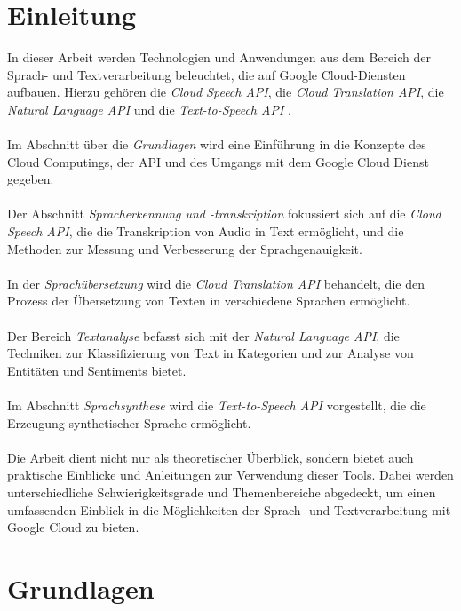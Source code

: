 \documentclass[12pt,a4paper]{article}
\begin{document}
\section*{Einleitung}
In dieser Arbeit werden Technologien und Anwendungen aus dem Bereich der Sprach- und Textverarbeitung beleuchtet, die auf Google Cloud-Diensten aufbauen. Hierzu gehören die \textit{Cloud Speech API}, die \textit{Cloud Translation API}, die \textit{Natural Language API} und die \textit{Text-to-Speech API} \cite{googlecloudskills2023}.
\\ \\
Im Abschnitt über die \textit{Grundlagen} wird eine Einführung in die Konzepte des Cloud Computings, der API und des Umgangs mit dem Google Cloud Dienst gegeben. 
\\ \\
Der Abschnitt \textit{Spracherkennung und -transkription} fokussiert sich auf die \textit{Cloud Speech API}, die die Transkription von Audio in Text ermöglicht, und die Methoden zur Messung und Verbesserung der Sprachgenauigkeit.
\\ \\
In der \textit{Sprachübersetzung} wird die \textit{Cloud Translation API} behandelt, die den Prozess der Übersetzung von Texten in verschiedene Sprachen ermöglicht.
\\ \\
Der Bereich \textit{Textanalyse} befasst sich mit der \textit{Natural Language API}, die Techniken zur Klassifizierung von Text in Kategorien und zur Analyse von Entitäten und Sentiments bietet.
\\ \\
Im Abschnitt \textit{Sprachsynthese} wird die \textit{Text-to-Speech API} vorgestellt, die die Erzeugung synthetischer Sprache ermöglicht.
\\ \\
Die Arbeit dient nicht nur als theoretischer Überblick, sondern bietet auch praktische Einblicke und Anleitungen zur Verwendung dieser Tools. Dabei werden unterschiedliche Schwierigkeitsgrade und Themenbereiche abgedeckt, um einen umfassenden Einblick in die Möglichkeiten der Sprach- und Textverarbeitung mit Google Cloud zu bieten.

	
\newpage

\section{Grundlagen}
\end{document}
